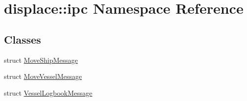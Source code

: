 \hypertarget{namespacedisplace_1_1ipc}{}\section{displace\+::ipc Namespace Reference}
\label{namespacedisplace_1_1ipc}
\subsection*{Classes}
\begin{DoxyCompactItemize}
\item 
struct \mbox{\hyperlink{structdisplace_1_1ipc_1_1_move_ship_message}{Move\+Ship\+Message}}
\item 
struct \mbox{\hyperlink{structdisplace_1_1ipc_1_1_move_vessel_message}{Move\+Vessel\+Message}}
\item 
struct \mbox{\hyperlink{structdisplace_1_1ipc_1_1_vessel_logbook_message}{Vessel\+Logbook\+Message}}
\end{DoxyCompactItemize}
